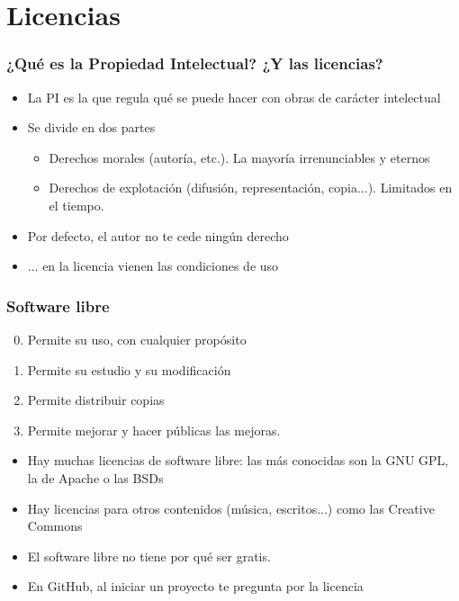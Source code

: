 \section{Licencias}


\begin{frame}
\frametitle{¿Qué es la Propiedad Intelectual? ¿Y las licencias?}

\begin{itemize}
   \item La PI es la que regula qué se puede hacer con obras de carácter intelectual
   \item Se divide en dos partes
   \begin{itemize}
      \item Derechos morales (autoría, etc.). La mayoría irrenunciables y eternos
      \item Derechos de explotación (difusión, representación, copia...). Limitados en el tiempo.
   \end{itemize}
   \item Por defecto, el autor no te cede ningún derecho
   \item ... en la licencia vienen las condiciones de uso
\end{itemize}

\end{frame}



\begin{frame}
\frametitle{Software libre}

\begin{enumerate}
  \setcounter{enumi}{-1}
   \item Permite su uso, con cualquier propósito
   \item Permite su estudio y su modificación
   \item Permite distribuir copias
   \item Permite mejorar y hacer públicas las mejoras.
\end{enumerate}

\begin{itemize}
  \item Hay muchas licencias de software libre: las más conocidas son la GNU GPL, la de Apache o las BSDs
  \item Hay licencias para otros contenidos (música, escritos...) como las Creative Commons
  \item El software libre no tiene por qué ser gratis.
  \item En GitHub, al iniciar un proyecto te pregunta por la licencia
\end{itemize}

\end{frame}

